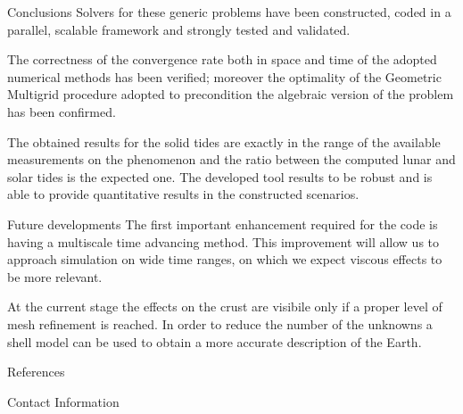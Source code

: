 \documentclass[final]{beamer}
\newlength{\onecolwid}
\begin{document}
\begin{frame}[t]
\begin{columns}[t]
\begin{column}{\onecolwid}
\begin{block}{Conclusions}
Solvers for these generic problems have been constructed, coded in a parallel,
scalable framework and strongly tested and validated.

The correctness of the convergence rate both in space and time of the adopted
numerical methods has been verified; moreover the optimality of the Geometric
Multigrid procedure adopted to precondition the algebraic version of the
problem has been confirmed.

The obtained results for the solid tides are exactly in the range of the
available measurements on the phenomenon and the ratio between the computed
lunar and solar tides is the expected one. The developed tool results to be
robust and is able to provide quantitative results in the constructed
scenarios.
\end{block}

\begin{block}{Future developments}
The first important enhancement required for the code is having a multiscale
time advancing method. This improvement will allow us to approach simulation on
wide time ranges, on which we expect viscous effects to be more relevant.

At the current stage the effects on the crust are visibile only if a proper
level of mesh refinement is reached. In order to reduce the number of the
unknowns a shell model can be used to obtain a more accurate description of the
Earth.
\end{block}

\begin{block}{References}

\nocite{*}
\footnotesize{
\vspace{0.75in}}

\end{block}

\begin{alertblock}{Contact Information}


\end{alertblock}
\end{column}
\end{columns}
\end{frame}
\end{document}

